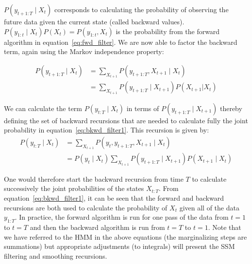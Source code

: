 $P(y_{t+1:T} \mid X_t)$ corresponds to calculating the probability of observing the future data given the current state (called backward values). $P(y_{1:t} \mid X_t)P(X_t) = P(y_{1:t}, X_t)$ is the probability from the forward algorithm in equation~\ref{eq:fwd_filter}. We are now able to factor the backward term, again using the Markov independence property:

\begin{equation}\label{eq:bkwd_filter2}
  \begin{split}
    P(y_{t+1:T} \mid X_t) &= \sum_{X_{t+1}} P(y_{t+1:T}, X_{t+1} \mid X_t) \\&= \sum_{X_{t+1}} P(y_{t+1:T} \mid X_{t+1})P(X_{t+1} | X_{t})
  \end{split}
\end{equation}

We can calculate the term $P(y_{t:T} \mid X_{t})$ in terms of $P(y_{t+1:T} \mid X_{t+1})$ thereby defining the set of backward recursions that are needed to calculate fully the joint probability in equation~\ref{eq:bkwd_filter1}. This recursion is given by:
\begin{equation}\label{eq:bkwd_filter3}
  \begin{split}
    P(y_{t:T} \mid X_t) &= \sum_{X_{t+1}} P(y_t, y_{t+1:T}, X_{t+1} \mid X_t) \\&= P(y_t \mid X_t) \sum_{X_{t+1}} P( y_{t+1:T} \mid X_{t+1} ) P( X_{t+1} \mid X_t )
  \end{split}
\end{equation}

One would therefore start the backward recursion from time $T$ to calculate successively the joint probabilities of the states $X_{t:T}$. From equation~\ref{eq:bkwd_filter1}, it can be seen that the forward and backward recursions are both used to calculate the probability of $X_{t}$ given all of the data $y_{1:T}$. In practice, the forward algorithm is run for one pass of the data from $t=1$ to $t=T$ and then the backward algorithm is run from $t=T$ to $t=1$. Note that we have referred to the HMM in the above equations (the marginalizing steps are summations) but appropriate adjustments (to integrals) will present the SSM filtering and smoothing recursions.

